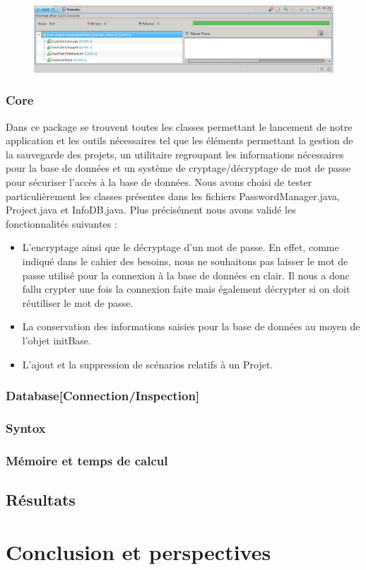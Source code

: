 \documentclass[12pt]{report}
\begin{document}
\begin{figure}[h!]
\begin{center}
	\includegraphics[scale=0.40]{resultatTest3.png}
\end{center}
\end{figure}
\subsection{Core}
	Dans ce package se trouvent toutes les classes permettant le lancement de notre application et les outils nécessaires tel que les éléments permettant la gestion de la sauvegarde des projets, un utilitaire regroupant les informations nécessaires pour la base de données et un système de cryptage/décryptage de mot de passe pour sécuriser l'accès à la base de données. 
Nous avons choisi de tester particulièrement les classes présentes dans les fichiers PasswordManager.java, Project.java et InfoDB.java. Plus précisément nous avons validé les fonctionnalités suivantes :
	\begin{itemize}
	\item L'encryptage ainsi que le décryptage d'un mot de passe. En effet, comme indiqué dans le cahier des besoins, nous ne souhaitons pas laisser le mot de passe utilisé pour la connexion à la base de données en clair. Il nous a donc fallu crypter une fois la connexion faite mais également décrypter si on doit réutiliser le mot de passe.
	\item La conservation des informations saisies pour la base de données au moyen de l'objet initBase. 
	\item L'ajout et la suppression de scénarios relatifs à un Projet.
	\end{itemize}
\subsection{Database[Connection/Inspection]}
\subsection{Syntox}

\subsection{Mémoire et temps de calcul}
	
\section{Résultats}

\chapter{Conclusion et perspectives}




\end{document}
